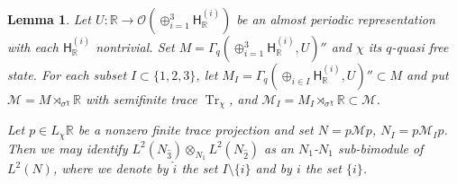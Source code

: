 \documentclass[a4paper,11pt]{amsart}
\newtheorem{lem}[thm]{Lemma}
\theoremstyle{definition}
\newcommand{\R}{{\mathbb R}}
\newcommand{\cM}{{\mathcal M}}
\newcommand{\cO}{{\mathcal O}}
\newcommand{\sH}{\mathsf{H}}
\newcommand{\Tr}{\operatorname{Tr}}
\newcommand{\ot}{\otimes}
\begin{document}
\begin{lem}\label{lem: embedding bimodules}
Let $U:\R\to \cO(\oplus_{i=1}^3 \sH_\R^{(i)})$ be an almost periodic representation with each $\sH_\R^{(i)}$ nontrivial.
Set $M=\Gamma_q(\oplus_{i=1}^3\sH_\R^{(i)}, U)''$ and $\chi$ its $q$-quasi free state.
For each subset $I\subset \{1,2,3\}$, let $M_I=\Gamma_q(\oplus_{i\in I} \sH_\R^{(i)}, U)''\subset M$
	and put $\cM=M\rtimes_{\sigma^\chi}\R$ with semifinite trace $\Tr_\chi$,
		and $\cM_I=M_I\rtimes_{\sigma^\chi}\R\subset \cM$.


Let $p\in L_\chi\R$ be a nonzero finite trace projection and set $N=p\cM p$, $N_I=p\cM_I p$.
Then we may identify $L^2(N_{\hat 3 })\ot_{ N_{1} } L^2(N_{\hat 2})$ as an $N_1$-$N_1$ sub-bimodule of $L^2(N)$,
	where we denote by $\hat i$ the set $I\setminus \{i\}$ and by $i$ the set $\{i\}$.
\end{lem}
\end{document}
